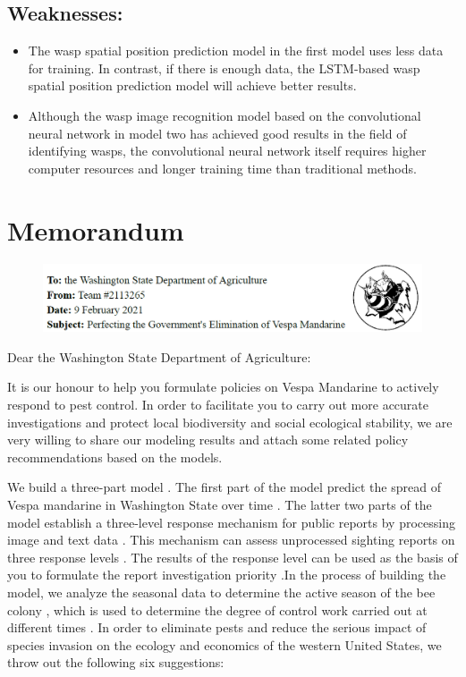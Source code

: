 \documentclass{mcmthesis}
\begin{document}
\hspace*{\fill}
\subsection{Weaknesses:}
\begin{itemize}
	\item The wasp spatial position prediction model in the first model uses less data for training. In contrast, if there is enough data, the LSTM-based wasp spatial position prediction model will achieve better results.
	\item Although the wasp image recognition model based on the convolutional neural network in model two has achieved good results in the field of identifying wasps, the convolutional neural network itself requires higher computer resources and longer training time than traditional methods.
\end{itemize}

\newpage
\section{Memorandum}
\begin{figure}[H]
	\centering
	\includegraphics[width=\textwidth]{screenshot023}
\end{figure}
Dear the Washington State Department of Agriculture:

It is our honour to help you formulate policies on Vespa Mandarine to actively respond to pest control. In order to facilitate you to carry out more accurate investigations and protect local biodiversity and social ecological stability, we are very willing to share our modeling results and attach some related policy recommendations based on the models.

We build a three-part model . The first part of the model predict the spread of Vespa mandarine in Washington State over time . The latter two parts of the model establish a three-level response mechanism for public reports by processing image and text data . This mechanism can assess unprocessed sighting reports on three response levels . The results of the response level can be used as the basis of you to formulate the report investigation priority .In the process of building the model, we analyze the seasonal data to determine the active season of the bee colony , which is used to determine the degree of control work carried out at different times .
In order to eliminate pests and reduce the serious impact of species invasion on the ecology and economics of the western United States, we throw out the following six suggestions:
\end{document}

